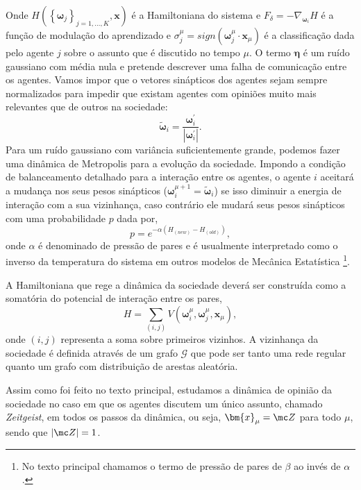 Onde $H\left(\left\{\bm{\omega}_j\right\}_{j=1,\ldots,K},\bm{x}\right)$
é a Hamiltoniana do sistema e $F_\delta = - \nabla_{\bm{\omega}_i}
H $ é a função de modulação do aprendizado e $\sigma_j^\mu =
sign\left(\bm{\omega}_j^\mu\cdot\bm{x}_\mu\right)$ é a classificação dada
pelo agente $j$ sobre o assunto que é discutido no tempo $\mu$. O termo
$\bm{\eta}$ é um ruído gaussiano com média nula e pretende descrever uma
falha de comunicação entre os agentes. Vamos impor que o vetores sinápticos
dos agentes sejam sempre normalizados para impedir que existam agentes com
opiniões muito mais relevantes que de outros na sociedade:
\[
\tilde{\bm{\omega}}_i = \frac{\bm \omega_i^\prime}
                {\left|\bm \omega_i^\prime\right|}.
\]
Para um ruído gaussiano com variância suficientemente grande, podemos
fazer uma dinâmica de Metropolis para a evolução da sociedade. Impondo
a condição de balanceamento detalhado para a interação entre os
agentes, o agente $i$ aceitará a mudança nos seus pesos sinápticos ($
\bm{\omega}_i^{\mu + 1} = \tilde{\bm{\omega}}_i $) se isso diminuir a energia
de interação com a sua vizinhança, caso contrário ele mudará seus pesos
sinápticos com uma probabilidade $p$ dada por,
\begin{equation}
p = e^{-\alpha\left( H_{\left( new \right)} - H_{\left( old \right)} \right)},
\end{equation}  
onde $\alpha$ é denominado de pressão de pares e é usualmente interpretado
como o inverso da temperatura do sistema em outros modelos de Mecânica
Estatística \footnote{No texto principal chamamos o termo de pressão de
pares de $\beta$ ao invés de $\alpha$.}.

A Hamiltoniana que rege a dinâmica da sociedade deverá ser construída como a
somatória do potencial de interação entre os pares,  
\begin{equation}
H = \sum_{\left(i,j\right)}  
    V\left(\bm{\omega}_i^\mu,\bm{\omega}_j^\mu,\bm{x}_\mu\right),
\label{eq:H1} 
\end{equation}
onde $(i,j)$ representa a soma sobre primeiros vizinhos. A vizinhança da
sociedade é definida através de um grafo $\mathcal{G}$ que pode ser tanto
uma rede regular quanto um grafo com distribuição de arestas aleatória.

Assim como foi feito no texto principal, estudamos a dinâmica de opinião
da sociedade no caso em que os agentes discutem um único assunto, chamado
\textit{Zeitgeist}, em todos os passos da dinâmica, ou seja, $\bm{x}_\mu =
\mc Z$ para todo $\mu$, sendo que $\left|\mc Z\right| = 1$.

